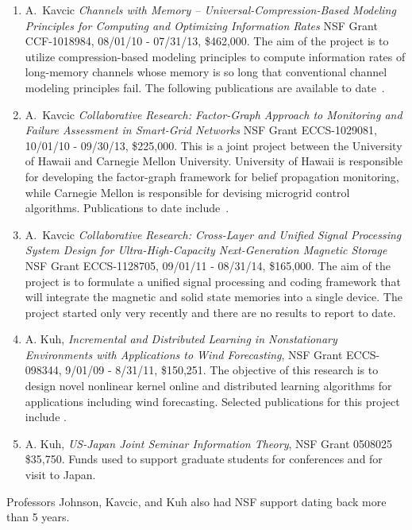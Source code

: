 \begin{enumerate}
\item A.~Kavcic {\em Channels with Memory -- Universal-Compression-Based
    Modeling Principles for Computing and Optimizing Information Rates}
  NSF Grant CCF-1018984, 08/01/10 - 07/31/13, \$462,000. The aim of
  the project is to utilize compression-based modeling principles
  to compute information rates of long-memory channels whose memory
  is so long that conventional channel modeling principles fail. The
  following publications are available to
  date~\cite{Lim11,Yuan11,JS1,JS2,JS3,JS4}.

\item A.~Kavcic {\em Collaborative Research: Factor-Graph Approach to
    Monitoring and Failure Assessment in Smart-Grid Networks}
  NSF Grant ECCS-1029081, 10/01/10 - 09/30/13, \$225,000.
  This is a joint project between the University of Hawaii and
  Carnegie Mellon University. University of Hawaii is responsible
  for developing the factor-graph framework for belief propagation
  monitoring, while Carnegie Mellon is responsible for devising
  microgrid control algorithms. Publications to date
  include~\cite{Hu10,Hu11,Hu11a}.

\item A.~Kavcic {\em Collaborative Research: Cross-Layer and Unified
    Signal Processing System Design for
    Ultra-High-Capacity Next-Generation Magnetic Storage}
  NSF Grant ECCS-1128705, 09/01/11 - 08/31/14, \$165,000.
  The aim of the project is to formulate a unified signal processing
  and coding framework that will integrate the magnetic and solid
  state memories into a single device. The project
  started only very recently and there are no results to report
  to date.

\item A. Kuh, {\em Incremental and Distributed Learning in Nonstationary
    Environments with Applications to Wind Forecasting}, NSF Grant ECCS-098344,
  9/01/09 - 8/31/11, \$150,251.  The objective of this research is to
  design novel nonlinear kernel online and distributed learning algorithms
  for applications including wind forecasting.  Selected publications for
  this project include \cite{kuhetal-10icgc,kowahl-kuh-10ijcnn}.

\item A. Kuh, {\em US-Japan Joint Seminar Information Theory}, NSF Grant 0508025
  \$35,750.  Funds used to support graduate students for conferences and
  for visit to Japan.
\end{enumerate}

Professors Johnson, Kavcic, and Kuh also had NSF support dating back more than 5 years.
